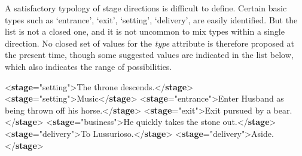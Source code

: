 A satisfactory typology of stage directions is difficult to define. Certain basic types such as ‘entrance’, ‘exit’, ‘setting’, ‘delivery’, are easily identified. But the list is not a closed one, and it is not uncommon to mix types within a single direction. No closed set of values for the {\itshape type} attribute is therefore proposed at the present time, though some suggested values are indicated in the list below, which also indicates the range of possibilities. \par\bgroup{}\exampleFont \begin{shaded}\noindent\mbox{}{<\textbf{stage}\hspace*{1em}{type}="{setting}">}The throne descends.{</\textbf{stage}>}\mbox{}\newline 
{<\textbf{stage}\hspace*{1em}{type}="{setting}">}Music{</\textbf{stage}>}\mbox{}\newline 
{<\textbf{stage}\hspace*{1em}{type}="{entrance}">}Enter Husband as being thrown off his horse.{</\textbf{stage}>}\mbox{}\newline 
{<\textbf{stage}\hspace*{1em}{type}="{exit}">}Exit pursued by a bear.{</\textbf{stage}>}\mbox{}\newline 
{<\textbf{stage}\hspace*{1em}{type}="{business}">}He quickly takes the stone out.{</\textbf{stage}>}\mbox{}\newline 
{<\textbf{stage}\hspace*{1em}{type}="{delivery}">}To Lussurioso.{</\textbf{stage}>}\mbox{}\newline 
{<\textbf{stage}\hspace*{1em}{type}="{delivery}">}Aside.{</\textbf{stage}>}\mbox{}\newline 

\end{shaded}
